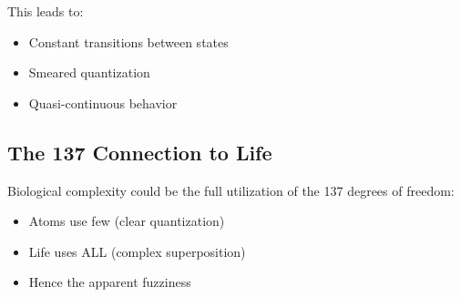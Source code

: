 	This leads to:
	\begin{itemize}
		\item Constant transitions between states
		\item Smeared quantization
		\item Quasi-continuous behavior
	\end{itemize}
	
	\subsection{The 137 Connection to Life}
	
	Biological complexity could be the full utilization of the 137 degrees of freedom:
	\begin{itemize}
		\item Atoms use few (clear quantization)
		\item Life uses ALL (complex superposition)
		\item Hence the apparent fuzziness
	\end{itemize}
	